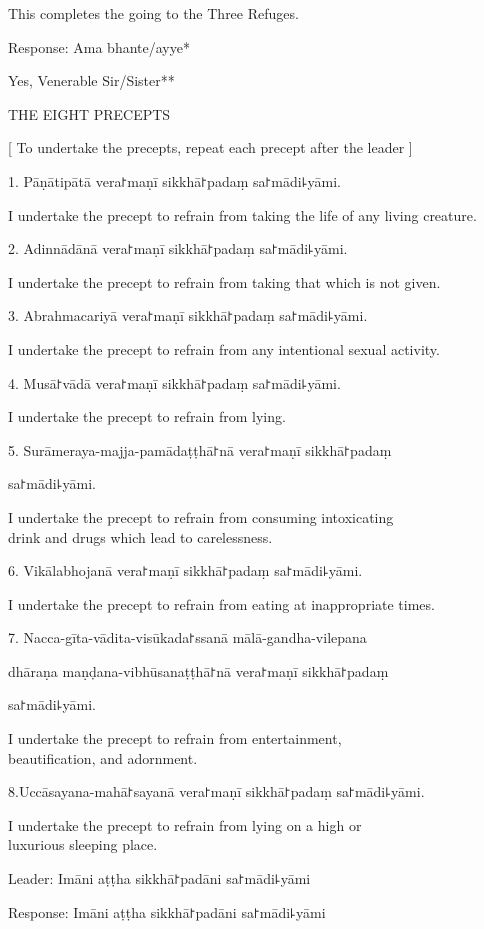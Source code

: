 This completes the going to the Three Refuges.

Response: Ama bhante/ayye*

Yes, Venerable Sir/Sister**

THE EIGHT PRECEPTS

[ To undertake the precepts, repeat each precept after the leader ]

1. Pāṇātipātā vera꜓maṇī sikkhā꜓padaṃ sa꜓mādi꜕yāmi.

I undertake the precept to refrain from taking the life of any living creature.

2. Adinnādānā vera꜓maṇī sikkhā꜓padaṃ sa꜓mādi꜕yāmi.

I undertake the precept to refrain from taking that which is not given.

3. Abrahmacariyā vera꜓maṇī sikkhā꜓padaṃ sa꜓mādi꜕yāmi.

I undertake the precept to refrain from any intentional sexual activity.

4. Musā꜓vādā vera꜓maṇī sikkhā꜓padaṃ sa꜓mādi꜕yāmi.

I undertake the precept to refrain from lying.

5. Surāmeraya-majja-pamādaṭṭhā꜓nā vera꜓maṇī sikkhā꜓padaṃ

sa꜓mādi꜕yāmi.

I undertake the precept to refrain from consuming intoxicating \\
drink and drugs which lead to carelessness.

6. Vikālabhojanā vera꜓maṇī sikkhā꜓padaṃ sa꜓mādi꜕yāmi.

I undertake the precept to refrain from eating at inappropriate times.

7. Nacca-gīta-vādita-visūkada꜓ssanā mālā-gandha-vilepana

dhāraṇa maṇḍana-vibhūsanaṭṭhā꜓nā vera꜓maṇī sikkhā꜓padaṃ

sa꜓mādi꜕yāmi.

I undertake the precept to refrain from entertainment, \\
beautification, and adornment.

8.Uccāsayana-mahā꜓sayanā vera꜓maṇī sikkhā꜓padaṃ sa꜓mādi꜕yāmi.

I undertake the precept to refrain from lying on a high or \\
luxurious sleeping place.

Leader: Imāni aṭṭha sikkhā꜓padāni sa꜓mādi꜕yāmi

Response: Imāni aṭṭha sikkhā꜓padāni sa꜓mādi꜕yāmi

